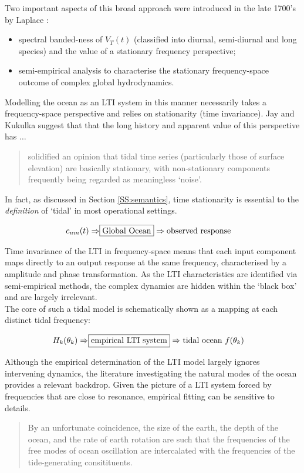 Two important aspects of this broad approach were introduced in the late 1700's by Laplace \cite[chpt 7]{Cartwright:2000tt}:
\begin{itemize}
\item spectral banded-ness of $V_T(t)$ (classified into diurnal, semi-diurnal and long species) and the value of a stationary frequency perspective;
\item semi-empirical analysis to characterise the stationary frequency-space outcome of complex global hydrodynamics. 
\end{itemize}


\BoxBegin
Modelling the ocean as an LTI system in this manner necessarily takes a frequency-space perspective and relies on stationarity (time invariance). Jay and Kukulka \citep{Jay:2003bj} suggest that that the long history and apparent value of this perspective has $\dots$
\begin{quotation}
solidified an opinion that tidal time series (particularly those of surface elevation) are basically stationary, with non-stationary components frequently being regarded as meaningless `noise'.    
\end{quotation}

In fact, as discussed in Section \ref{SS:semantics}, time stationarity is essential to the \emph{definition} of `tidal' in most operational settings.
\BoxEnd


\begin{align}
    c_{nm}(t)       \Rightarrow & \fbox{Global Ocean} \Rightarrow \mbox{observed response}                \nonumber 
\end{align}


Time invariance of the LTI in frequency-space means that each input component maps directly to an output response at the same frequency, characterised by a amplitude and phase transformation.   As the LTI characteristics are identified via semi-empirical methods,  the complex dynamics are hidden within the `black box' and are largely irrelevant.\\
The core of such a tidal model is schematically shown as a mapping at each distinct tidal frequency:

\begin{align}
\label{E:LTI}
H_{k}(\theta_k) \Rightarrow & \fbox{empirical LTI system} \Rightarrow \mbox{tidal ocean $f(\theta_k)$}  %
\end{align}

Although the empirical determination of the LTI model largely ignores intervening dynamics, the literature investigating the natural modes of the ocean provides a relevant backdrop.  Given the picture of a LTI system forced by frequencies that are close to resonance, empirical fitting can be sensitive to details.
\begin{quotation}
By an unfortunate coincidence, the size of the earth, the depth of the ocean, and the rate of earth rotation are such that the frequencies of the free modes of ocean oscillation are intercalated with the frequencies of the tide-generating consitituents.\citep{Groves:1975ky}
\end{quotation}



